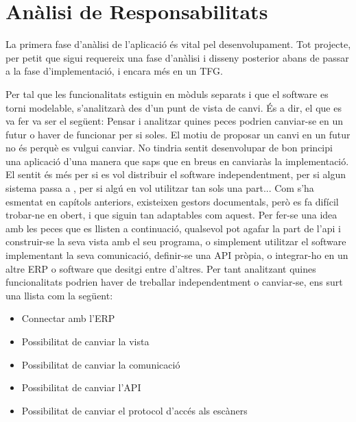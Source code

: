 \documentclass[letterpaper,11pt,catalan]{sphinxmanual}
\begin{document}
\section{Anàlisi de Responsabilitats}
\label{\detokenize{index:analisi-de-responsabilitats}}
La primera fase d'anàlisi de l'aplicació és vital pel desenvolupament. Tot projecte, per
petit que sigui requereix una fase d'anàlisi i disseny posterior abans de passar a la fase
d'implementació, i encara més en un TFG.

Per tal que les funcionalitats estiguin en mòduls separats i que el software es
torni modelable, s'analitzarà des d'un punt de vista de canvi. És a dir, el que
es va fer va ser el següent: Pensar i analitzar quines peces podrien canviar-se
en un futur o haver de funcionar per si soles. El motiu de proposar un canvi en un
futur no és perquè es vulgui canviar. No tindria sentit desenvolupar de bon principi
una aplicació d'una manera que saps que en breus en canviaràs la implementació. El
sentit és més per si es vol distribuir el software independentment, per si algun
sistema passa a , per si algú en vol utilitzar tan sols una part...
Com s'ha esmentat en capítols anteriors, existeixen gestors documentals, però es fa
difícil trobar-ne en obert, i que siguin tan adaptables com aquest. Per fer-se una
idea amb les \sphinxquotedblleft{}peces\sphinxquotedblright{} que es llisten a continuació, qualsevol pot agafar la part de
l'api i construir-se la seva vista amb el seu programa, o simplement utilitzar el
software implementant la seva comunicació, definir-se una API pròpia, o integrar-ho
en un altre ERP o software que desitgi entre d'altres. Per tant analitzant quines
funcionalitats podrien haver de treballar independentment o canviar-se, ens surt una
llista com la següent:
\begin{itemize}
\item {} 
Connectar amb l'ERP

\item {} 
Possibilitat de canviar la vista

\item {} 
Possibilitat de canviar la comunicació

\item {} 
Possibilitat de canviar l'API

\item {} 
Possibilitat de canviar el protocol d'accés als escàners

\end{itemize}
\end{document}
